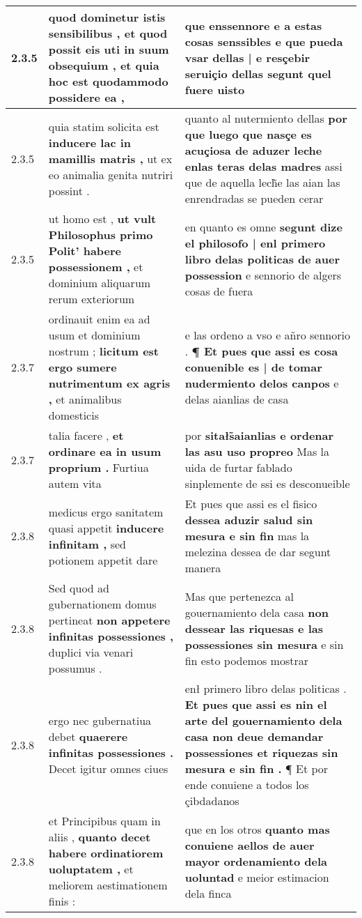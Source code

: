 \begin{tabular}{|p{1cm}|p{6.5cm}|p{6.5cm}|}
2.3.5 & quod dominetur istis sensibilibus , \textbf{ et quod possit eis uti in suum obsequium , } et quia hoc est quodammodo possidere ea , & que enssennore e a estas cosas senssibles \textbf{ e que pueda vsar dellas | e resçebir seruiçio dellas } segunt quel fuere uisto \\\hline
2.3.5 & quia statim solicita est \textbf{ inducere lac in mamillis matris , } ut ex eo animalia genita nutriri possint . & quanto al nutermiento dellas \textbf{ por que luego que nasçe es acuçiosa de aduzer leche enlas teras delas madres } assi que de aquella lech̃e las aian las enrendradas se pueden cerar \\\hline
2.3.5 & ut homo est , \textbf{ ut vult Philosophus primo Polit’ habere possessionem , } et dominium aliquarum rerum exteriorum & en quanto es omne \textbf{ segunt dize el philosofo | enl primero libro delas politicas de auer possession } e sennorio de algers cosas de fuera \\\hline
2.3.7 & ordinauit enim ea ad usum et dominium nostrum ; \textbf{ licitum est ergo sumere nutrimentum ex agris , } et animalibus domesticis & e las ordeno a vso e añro sennorio . \textbf{ ¶ Et pues que assi es cosa conuenible es | de tomar nudermiento delos canpos } e delas aianlias de casa \\\hline
2.3.7 & talia facere , \textbf{ et ordinare ea in usum proprium . } Furtiua autem vita & por \textbf{ sitałs̃aianlias e ordenar las asu uso propreo } Mas la uida de furtar fablado sinplemente de ssi es desconueible \\\hline
2.3.8 & medicus ergo sanitatem quasi appetit \textbf{ inducere infinitam , } sed potionem appetit dare & Et pues que assi es el fisico \textbf{ dessea aduzir salud sin mesura e sin fin } mas la melezina dessea de dar segunt manera \\\hline
2.3.8 & Sed quod ad gubernationem domus pertineat \textbf{ non appetere infinitas possessiones , } duplici via venari possumus . & Mas que pertenezca al gouernamiento dela casa \textbf{ non dessear las riquesas e las possessiones sin mesura } e sin fin esto podemos mostrar \\\hline
2.3.8 & ergo nec gubernatiua debet \textbf{ quaerere infinitas possessiones . } Decet igitur omnes ciues & enł primero libro delas politicas . \textbf{ Et pues que assi es nin el arte del gouernamiento dela casa non deue demandar possessiones et riquezas sin mesura e sin fin . } ¶ Et por ende conuiene a todos los çibdadanos \\\hline
2.3.8 & et Principibus quam in aliis , \textbf{ quanto decet habere ordinatiorem uoluptatem , } et meliorem aestimationem finis : & que en los otros \textbf{ quanto mas conuiene aellos de auer mayor ordenamiento dela uoluntad } e meior estimacion dela finca \\\hline

\end{tabular}
